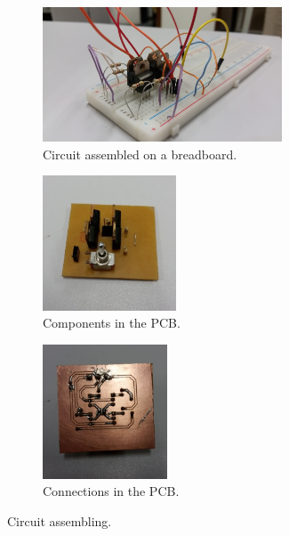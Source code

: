 \begin{figure}
\centering
\begin{subfigure}{\columnwidth}
\centering
\includegraphics[height=4cm]{img/h_bridge_proto_close.jpg}
\caption{Circuit assembled on a breadboard.}
\label{fig:proto_h}
\end{subfigure}

\begin{subfigure}{.45\columnwidth}
\includegraphics[height=4cm]{img/compontentes4.jpg}
\caption{Components in the PCB.}
\label{fig:pcb_top}
\end{subfigure}
\begin{subfigure}{.45\columnwidth}
\centering
\includegraphics[height=4cm]{img/solda_ja_saiu_da_jaula.jpg}
\caption{Connections in the PCB.}
\label{fig:pcb_bot}
\end{subfigure}

\caption{Circuit assembling.}
\end{figure}
